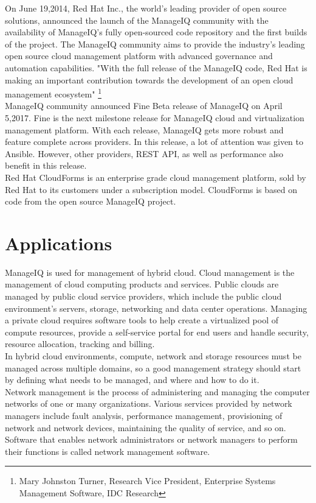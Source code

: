 \documentclass[a4paper,12pt]{report}
\begin{document}
On June 19,2014, Red Hat Inc., the world’s leading provider of open source solutions, announced the launch of the ManageIQ community with the availability of ManageIQ’s fully open-sourced code repository and the first builds of the project. The ManageIQ community aims to provide the industry's leading open source cloud management platform with advanced governance and automation capabilities.
"With the full release of the ManageIQ code, Red Hat is making an important contribution towards the development of an open cloud management ecosystem"
\footnote{Mary Johnston Turner, Research Vice President, Enterprise Systems Management Software, IDC Research}\\

ManageIQ community announced Fine Beta release of ManageIQ on April 5,2017. Fine is the next milestone release for ManageIQ cloud and virtualization management platform. With each release, ManageIQ gets more robust and feature complete across providers. In this release, a lot of attention was given to Ansible. However, other providers, REST API, as well as performance also benefit in this release.\\

Red Hat CloudForms is an enterprise grade cloud management platform, sold by Red Hat to its customers under a subscription model. CloudForms is based on code from the open source ManageIQ project.

\chapter{Applications}
ManageIQ is used for management of hybrid cloud. Cloud management is the management of cloud computing products and services. Public clouds are managed by public cloud service providers, which include the public cloud environment’s servers, storage, networking and data center operations. Managing a private cloud requires software tools to help create a virtualized pool of compute resources, provide a self-service portal for end users and handle security, resource allocation, tracking and billing.\\

In hybrid cloud environments, compute, network and storage resources must be managed across multiple domains, so a good management strategy should start by defining what needs to be managed, and where and how to do it.\\

Network management is the process of administering and managing the computer networks of one or many organizations. Various services provided by network managers include fault analysis, performance management, provisioning of network and network devices, maintaining the quality of service, and so on. Software that enables network administrators or network managers to perform their functions is called network management software.\\
\end{document}
